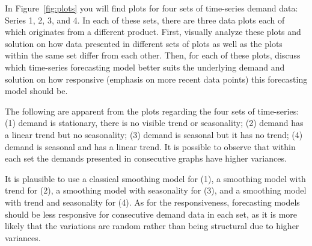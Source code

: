 \begin{exercise} \label{plots} 
In Figure~\ref{fig:plots} you will find plots for four sets of time-series demand data: Series 1, 2, 3, and 4. In each of these sets, there are three data plots each of which originates from a different product. First, visually analyze these plots and solution on how data presented in different sets of plots as well as the plots within the same set differ from each other. Then, for each of these plots, discuss which time-series forecasting model better suits the underlying demand and solution on how responsive (emphasis on more recent data points) this forecasting model should be.



  \begin{solution}
The following are apparent from the plots regarding the four sets of time-series: (1) demand is stationary, there is no visible trend or seasonality; (2) demand has a linear trend but no seasonality; (3) demand is seasonal but it has no trend; (4) demand is seasonal and has a linear trend. It is possible to observe that within each set the demands presented in consecutive graphs have higher variances. 

It is plausible to use a classical smoothing model for (1), a smoothing model with trend for (2), a smoothing model with seasonality for (3), and a smoothing model with trend and seasonality for (4). As for the responsiveness, forecasting models should be less responsive for consecutive demand data in each set, as it is more likely that the variations are random rather than being structural due to higher variances. 
  \end{solution}
\end{exercise}


%   
%










